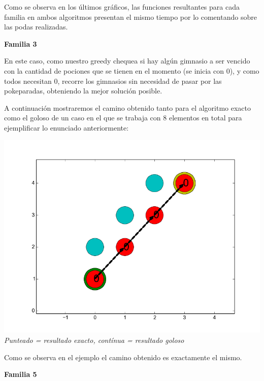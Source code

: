 Como se observa en los \'ultimos gr\'aficos, las funciones resultantes para cada familia en ambos algoritmos presentan el mismo tiempo por lo comentando sobre las podas realizadas.

\begin{center}
\textbf{Familia 3}
\end{center}

En este caso, como nuestro greedy chequea si hay alg\'un gimnasio a ser vencido con la cantidad de pociones que se tienen en el momento (se inicia con 0), y como todos necesitan 0, recorre los gimnasios sin necesidad de pasar por las pokeparadas, obteniendo la mejor soluci\'on posible.

A continuaci\'on mostraremos el camino obtenido tanto para el algoritmo exacto como el goloso de un caso en el que se trabaja con 8 elementos en total para ejemplificar lo enunciado anteriormente:

   \vspace*{0.3cm} \vspace*{0.3cm}
  \begin{center}
\includegraphics[scale=0.40]{./EJ2/todos0.png}
\\{\textit{Punteado = resultado exacto, contínua = resultado goloso}}
  \end{center}
  \vspace*{0.3cm}

Como se observa en el ejemplo el camino obtenido es exactamente el mismo.

\begin{center}
\textbf{Familia 5}
\end{center}

